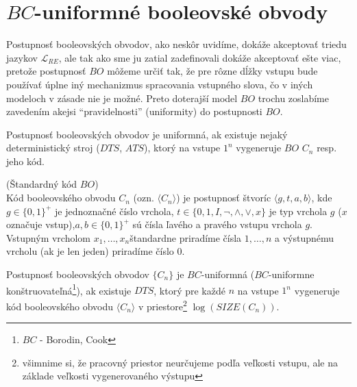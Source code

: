 \section{$BC$-uniformné booleovské obvody}

Postupnosť booleovských obvodov, ako neskôr uvidíme, dokáže
akceptovať triedu jazykov $\mathcal{L}_{RE}$, ale tak ako sme ju
zatial zadefinovali dokáže akceptovať ešte viac, pretože
postupnosť $BO$ môžeme určiť tak, že pre rôzne dĺžky vstupu bude
používať úplne iný mechanizmus spracovania vstupného slova, čo v
iných modeloch v zásade nie je možné. Preto doterajší model $BO$
trochu zoslabíme zavedením akejsi ``pravidelnosti'' (uniformity)
do postupnosti $BO$.

\begin{definicia}
Postupnosť booleovských obvodov je uniformná, ak existuje nejaký
deterministický stroj ($DTS$, $ATS$), ktorý na vstupe $1^n$
vygeneruje $BO$ $C_n$ resp. jeho kód.
\end{definicia}

\begin{definicia}
(Štandardný kód $BO$)
\\ Kód booleovského obvodu $C_n$ (ozn. $\langle C_n\rangle$) je postupnosť
štvoríc $\langle g,t,a,b\rangle$, kde $g\in\{ 0,1\}^+$ je
jednoznačné číslo vrchola, $t\in\{ 0, 1, I,\neg,\wedge,\vee, x\}$
je typ vrchola $g$ ($x$ označuje vstup),\newline $a,b\in\{
0,1\}^+$ sú čísla ľavého a pravého vstupu vrchola $g$. Vstupným
vrcholom $x_1,\dots ,x_n$\linebreak štandardne priradíme čísla
$1,\dots ,n$ a výstupnému vrcholu (ak je len jeden) priradíme
číslo 0.
\end{definicia}

\begin{definicia}
Postupnosť booleovských obvodov $\{ C_n\}$ je $BC$-uniformná
($BC$-uniformne \linebreak konštruovateľná\footnote{$BC$ -
Borodin, Cook}), ak existuje $DTS$, ktorý pre každé $n$ na vstupe
$1^n$ vygeneruje kód booleovského obvodu $\langle C_n\rangle$ v
priestore\footnote{všimnime si, že pracovný priestor neurčujeme podľa veľkosti
vstupu, ale na základe veľkosti vygenerovaného výstupu} $\log
(SIZE(C_n))$.
\end{definicia}

